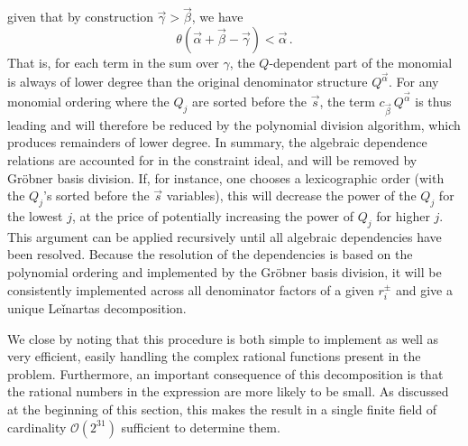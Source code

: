 given that by construction $\vec\gamma > \vec\beta$, we
have  
\begin{equation}
\theta(\vec\alpha + \vec\beta - \vec\gamma) < \vec\alpha\,.
\end{equation}
That is, for each term in the sum over $\gamma$, the $Q$-dependent part of the
monomial is always of lower degree than the original denominator 
structure $Q^{\vec{\alpha}}$.
For any monomial ordering where the $Q_j$ are sorted before the $\vec s$, the term  
$c_{\vec{\beta}}\,Q^{\vec{\alpha}}$ is thus leading and will 
therefore be reduced by the polynomial 
division algorithm, which produces remainders of lower degree.
In summary, the algebraic dependence relations are accounted for in the 
constraint ideal, and will be removed by Gröbner basis division. 
If, for instance,
one chooses 
a lexicographic order (with the $Q_j$'s sorted before the $\vec s$ variables), 
this will decrease the power of the $Q_j$ for the lowest $j$, 
at the price of potentially increasing the power of $Q_j$ for higher $j$.
This argument can be applied recursively until all algebraic dependencies have been 
resolved. Because the resolution of the dependencies is based on the polynomial ordering
and implemented by the Gröbner basis division, it will be
consistently implemented across all denominator factors of a given $r_i^{\pm}$ and
give a unique Leǐnartas decomposition.


We close by noting that this procedure is both simple to implement as
well as very efficient, easily handling the complex rational functions
present in the problem.  Furthermore, an important consequence of this
decomposition is that the rational numbers in the expression are
more likely to be small. As discussed at the beginning of this section,
this makes the result in a single finite field of cardinality $\mathcal{O}(2^{31})$ 
sufficient to determine them.


